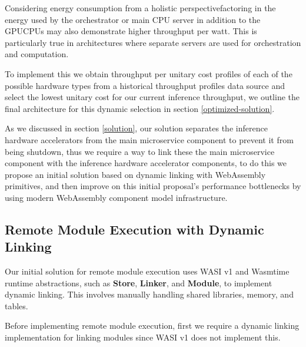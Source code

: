 Considering energy consumption from a holistic perspective\textemdash{}factoring in the energy used by the orchestrator or main CPU server in addition to the GPU\textemdash{}CPUs may also demonstrate higher throughput per watt. This is particularly true in architectures where separate servers are used for orchestration and computation. 

To implement this we obtain throughput per unitary cost profiles of each of the possible hardware types from a historical throughput profiles data source and select the lowest unitary cost for our current inference throughput, we outline the final architecture for this dynamic selection in section \ref{optimized-solution}.


 As we discussed in section \ref{solution}, our solution separates the inference hardware accelerators from the main microservice component to prevent it from being shutdown, thus we require a way to link these the main microservice component with the inference hardware accelerator components, to do this we propose an initial solution based on dynamic linking with WebAssembly primitives, and then improve on this initial proposal's performance bottlenecks by using modern WebAssembly component model infrastructure.

\subsection{Remote Module Execution with Dynamic Linking}
Our initial solution for remote module execution uses WASI v1 and Wasmtime runtime abstractions, such as \textbf{Store}, \textbf{Linker}, and \textbf{Module}, to implement dynamic linking. This involves manually handling shared libraries, memory, and tables.

Before implementing remote module execution, first we require a dynamic linking implementation for linking modules since WASI v1 does not implement this.



